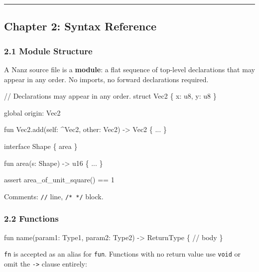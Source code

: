 \documentclass[
  11pt,
]{article}
\newenvironment{Shaded}{\begin{snugshade}}{\end{snugshade}}
\newcommand{\NormalTok}[1]{#1}
\begin{document}
\begin{center}\rule{0.5\linewidth}{0.5pt}\end{center}

\hypertarget{chapter-2-syntax-reference}{%
\subsection{Chapter 2: Syntax
Reference}\label{chapter-2-syntax-reference}}

\hypertarget{module-structure}{%
\subsubsection{2.1 Module Structure}\label{module-structure}}

A Nanz source file is a \textbf{module}: a flat sequence of top-level
declarations that may appear in any order. No imports, no forward
declarations required.

\begin{Shaded}
\begin{Highlighting}[]
\NormalTok{// Declarations may appear in any order.}
\NormalTok{struct Vec2 \{ x: u8, y: u8 \}}

\NormalTok{global origin: Vec2}

\NormalTok{fun Vec2.add(self: \^{}Vec2, other: Vec2) {-}\textgreater{} Vec2 \{ ... \}}

\NormalTok{interface Shape \{ area \}}

\NormalTok{fun area(s: Shape) {-}\textgreater{} u16 \{ ... \}}

\NormalTok{assert area\_of\_unit\_square() == 1}
\end{Highlighting}
\end{Shaded}

Comments: \texttt{//} line, \texttt{/*\ */} block.

\hypertarget{functions}{%
\subsubsection{2.2 Functions}\label{functions}}

\begin{Shaded}
\begin{Highlighting}[]
\NormalTok{fun name(param1: Type1, param2: Type2) {-}\textgreater{} ReturnType \{}
\NormalTok{    // body}
\NormalTok{\}}
\end{Highlighting}
\end{Shaded}

\texttt{fn} is accepted as an alias for \texttt{fun}. Functions with no
return value use \texttt{void} or omit the \texttt{-\textgreater{}}
clause entirely:
\end{document}
